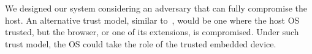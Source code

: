  We designed our system considering an adversary that can fully compromise the host. An alternative trust model, similar to~\cite{gyrus,nab}, would be one where the host OS trusted, but the browser, or one of its extensions, is compromised. Under such trust model, the OS could take the role of the trusted embedded device. 




